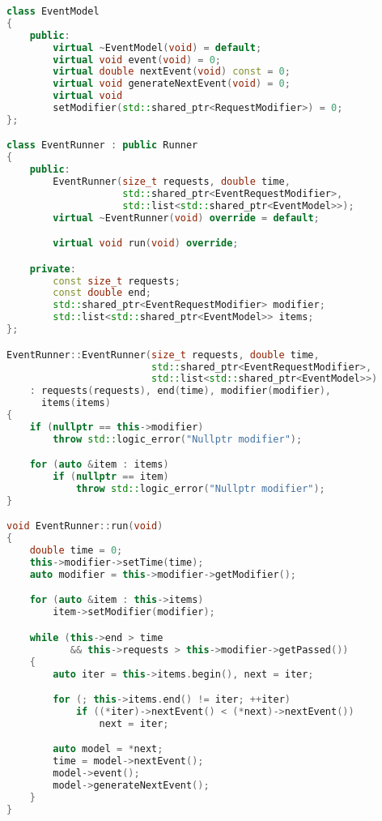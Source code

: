 \begin{lstlisting}[caption={Реализация событийного подхода}, language=c++]
class EventModel
{
    public:
        virtual ~EventModel(void) = default;
        virtual void event(void) = 0;
        virtual double nextEvent(void) const = 0;
        virtual void generateNextEvent(void) = 0;
        virtual void
        setModifier(std::shared_ptr<RequestModifier>) = 0;
};

class EventRunner : public Runner
{
    public:
        EventRunner(size_t requests, double time,
                    std::shared_ptr<EventRequestModifier>,
                    std::list<std::shared_ptr<EventModel>>);
        virtual ~EventRunner(void) override = default;

        virtual void run(void) override;

    private:
        const size_t requests;
        const double end;
        std::shared_ptr<EventRequestModifier> modifier;
        std::list<std::shared_ptr<EventModel>> items;
};

EventRunner::EventRunner(size_t requests, double time,
                         std::shared_ptr<EventRequestModifier>,
                         std::list<std::shared_ptr<EventModel>>)
    : requests(requests), end(time), modifier(modifier),
      items(items)
{
    if (nullptr == this->modifier)
        throw std::logic_error("Nullptr modifier");

    for (auto &item : items)
        if (nullptr == item)
            throw std::logic_error("Nullptr modifier");
}

void EventRunner::run(void)
{
    double time = 0;
    this->modifier->setTime(time);
    auto modifier = this->modifier->getModifier();

    for (auto &item : this->items)
        item->setModifier(modifier);

    while (this->end > time
           && this->requests > this->modifier->getPassed())
    {
        auto iter = this->items.begin(), next = iter;

        for (; this->items.end() != iter; ++iter)
            if ((*iter)->nextEvent() < (*next)->nextEvent())
                next = iter;

        auto model = *next;
        time = model->nextEvent();
        model->event();
        model->generateNextEvent();
    }
}
\end{lstlisting}

